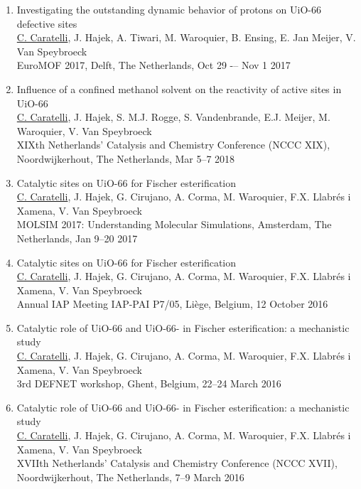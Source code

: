 \begin{enumerate}
\item
Investigating the outstanding dynamic behavior of protons on UiO-66 defective sites\\
\underline{C. Caratelli}, J. Hajek, A. Tiwari, M. Waroquier, B. Ensing, E. Jan Meijer, V. Van Speybroeck\\ 
EuroMOF 2017, Delft, The Netherlands, Oct 29 -– Nov 1 2017

\item	
Influence of a confined methanol solvent on the reactivity of active sites in UiO-66\\
\underline{C. Caratelli}, J. Hajek, S. M.J. Rogge, S. Vandenbrande, E.J. Meijer, M. Waroquier, V. Van Speybroeck\\ XIXth Netherlands' Catalysis and Chemistry Conference (NCCC XIX), Noordwijkerhout, The Netherlands, Mar 5--7 2018

\item
Catalytic sites on UiO-66 for Fischer esterification\\
\underline{C. Caratelli}, J. Hajek, G. Cirujano, A. Corma, M. Waroquier, F.X.
Llabr\'es i Xamena, V. Van Speybroeck\\
MOLSIM 2017: Understanding Molecular Simulations, Amsterdam, The Netherlands, Jan 9--20 2017

\item
Catalytic sites on UiO-66 for Fischer esterification\\
\underline{C. Caratelli}, J. Hajek, G. Cirujano, A. Corma, M. Waroquier, F.X.
Llabr\'es i Xamena, V. Van Speybroeck\\
Annual IAP Meeting IAP-PAI P7/05, Li\`ege, Belgium, 12 October 2016

\item
Catalytic role of UiO-66 and UiO-66- in Fischer esterification: a
mechanistic study\\
\underline{C. Caratelli}, J. Hajek, G. Cirujano, A. Corma, M. Waroquier, F.X.
Llabr\'es i Xamena, V. Van Speybroeck\\
3rd DEFNET workshop, Ghent, Belgium, 22--24 March 2016

\item
Catalytic role of UiO-66 and UiO-66- in Fischer esterification: a
mechanistic study\\
\underline{C. Caratelli}, J. Hajek, G. Cirujano, A. Corma, M. Waroquier, F.X.
Llabr\'es i Xamena, V. Van Speybroeck\\
XVIIth Netherlands' Catalysis and Chemistry Conference (NCCC XVII),
Noordwijkerhout, The Netherlands, 7--9 March 2016

\end{enumerate}
\clearpage{\pagestyle{empty}\cleardoublepage}
